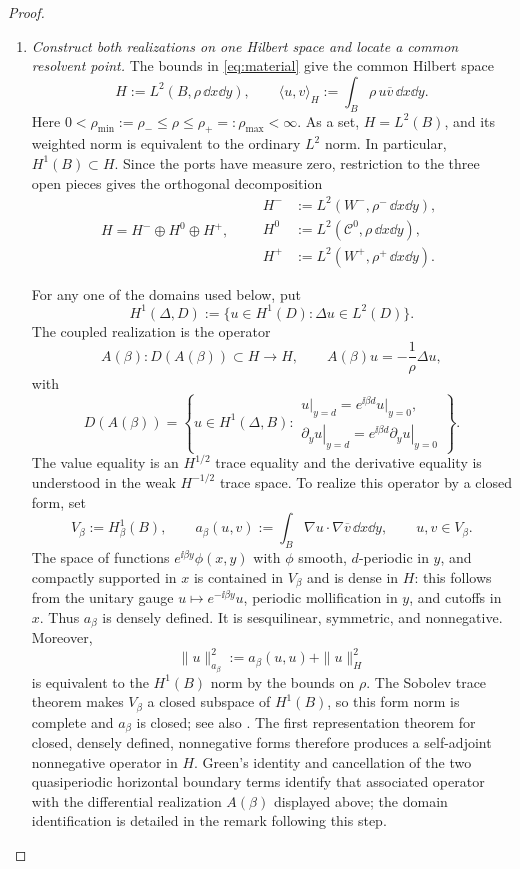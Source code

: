 \begin{proof}
\begin{enumerate}[label=\textit{Step \arabic*.},leftmargin=*]
\item \emph{Construct both realizations on one Hilbert space and locate a
common resolvent point.}
The bounds in \eqref{eq:material} give the common Hilbert space
\[
  H:=L^2(B,\rho\,\dd x\dd y),
  \qquad
  \langle u,v\rangle_H
  :=\int_B\rho\,u\overline v\,\dd x\dd y.
\]
Here
$0<\rho_{\min}:=\rho_-\leq\rho\leq\rho_+=:\rho_{\max}<\infty$.
As a set, $H=L^2(B)$, and its weighted norm is equivalent to the ordinary
$L^2$ norm.  In particular, $H^1(B)\subset H$.  Since the ports have measure
zero, restriction to the three open pieces gives the orthogonal decomposition
\[
  H=H^-\oplus H^0\oplus H^+,
  \qquad
  \begin{aligned}
    H^-&:=L^2(W^-,\rho^-\,\dd x\dd y),\\
    H^0&:=L^2(\mathcal C^0,\rho\,\dd x\dd y),\\
    H^+&:=L^2(W^+,\rho^+\,\dd x\dd y).
  \end{aligned}
\]

For any one of the domains used below, put
\[
  H^1(\Delta,D):=\{u\in H^1(D):\Delta u\in L^2(D)\}.
\]
The coupled realization is the operator
\[
  A(\beta):D(A(\beta))\subset H\longrightarrow H,
  \qquad A(\beta)u=-\frac1\rho\Delta u,
\]
with
\[
  D(A(\beta))=\left\{u\in H^1(\Delta,B):
  \begin{array}{l}
    \left.u\right|_{y=d}
      =e^{\ii\beta d}\left.u\right|_{y=0},\\[-1mm]
    \left.\partial_yu\right|_{y=d}
      =e^{\ii\beta d}\left.\partial_yu\right|_{y=0}
  \end{array}\right\}.
\]
The value equality is an $H^{1/2}$ trace equality and the derivative equality
is understood in the weak $H^{-1/2}$ trace space.  To realize this operator by
a closed form, set
\[
  V_\beta:=H^1_\beta(B),
  \qquad
  a_\beta(u,v):=\int_B\nabla u\cdot\nabla\overline v\,\dd x\dd y,
  \qquad u,v\in V_\beta.
\]
The space of functions $e^{\ii\beta y}\phi(x,y)$ with $\phi$ smooth,
$d$-periodic in $y$, and compactly supported in $x$ is contained in
$V_\beta$ and is dense in $H$: this follows from the unitary gauge
$u\mapsto e^{-\ii\beta y}u$, periodic mollification in $y$, and cutoffs in
$x$.  Thus $a_\beta$ is densely defined.  It is sesquilinear, symmetric, and
nonnegative.  Moreover,
\[
  \|u\|_{a_\beta}^2
  :=a_\beta(u,u)+\|u\|_H^2
\]
is equivalent to the $H^1(B)$ norm by the bounds on $\rho$.  The Sobolev trace
theorem makes $V_\beta$ a closed subspace of $H^1(B)$, so this form norm is
complete and $a_\beta$ is closed; see also
\cite[Chapter~3]{McLean2000}.  The first representation theorem for closed,
densely defined, nonnegative forms
\cite[Chapter~VI, Section~2]{Kato1995} therefore produces a self-adjoint
nonnegative operator in $H$.  Green's identity and cancellation of the two
quasiperiodic horizontal boundary terms identify that associated operator
with the differential realization $A(\beta)$ displayed above; the domain
identification is detailed in the remark following this step.


\end{enumerate}
\end{proof}
